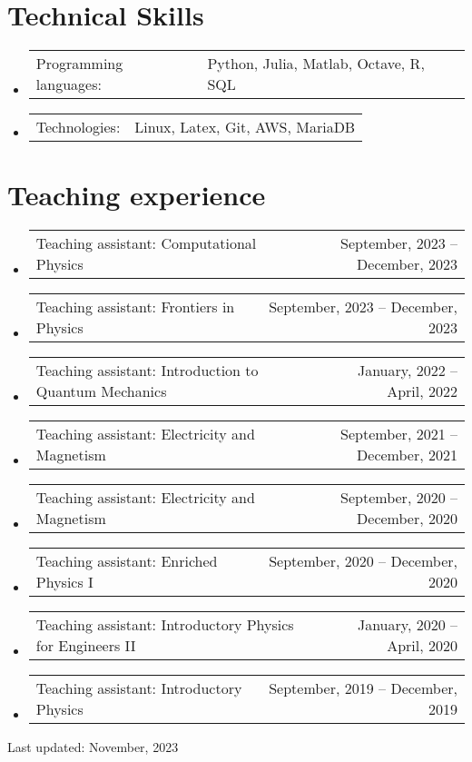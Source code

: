\documentclass[letterpaper,11pt]{article}
\makeatletter
\newcommand{\TeachingItem}[2]{
	\item{\vspace{-1pt}
		\begin{tabular*}{0.92\textwidth}{l@{\extracolsep{\fill}}r}
			{#1} & {#2}
		\end{tabular*}
		\vspace{-5pt}
	}
}
\newcommand{\SkillsItem}[2]{
	\item{\vspace{-1pt}
		\begin{tabular*}{0.97\textwidth}{l l}
			{#1:} & {#2}
		\end{tabular*}
		\vspace{-5pt}
	}
}
\makeatother
\begin{document}
\section*{Technical Skills}
\begin{itemize}[leftmargin=*]
	\SkillsItem{Programming languages}{Python, Julia, Matlab, Octave, R, SQL}
	\SkillsItem{Technologies}{Linux, Latex, Git, AWS, MariaDB}
\end{itemize}

\section*{Teaching experience}
\begin{itemize}[leftmargin=*]
	\TeachingItem{Teaching assistant: Computational Physics}{September, 2023 -- December, 2023}
	\TeachingItem{Teaching assistant: Frontiers in Physics}{September, 2023 -- December, 2023}
	\TeachingItem{Teaching assistant: Introduction to Quantum Mechanics}{January, 2022 -- April, 2022}
	\TeachingItem{Teaching assistant: Electricity and Magnetism}{September, 2021 -- December, 2021}
	\TeachingItem{Teaching assistant: Electricity and Magnetism}{September, 2020 -- December, 2020}
	\TeachingItem{Teaching assistant: Enriched Physics I}{September, 2020 -- December, 2020}
	\TeachingItem{Teaching assistant: Introductory Physics for Engineers II}{January, 2020 -- April, 2020}
	\TeachingItem{Teaching assistant: Introductory Physics}{September, 2019 -- December, 2019}
\end{itemize}

\vspace{1cm}

\begin{flushright}
	Last updated: November, 2023
\end{flushright}
\end{document}
